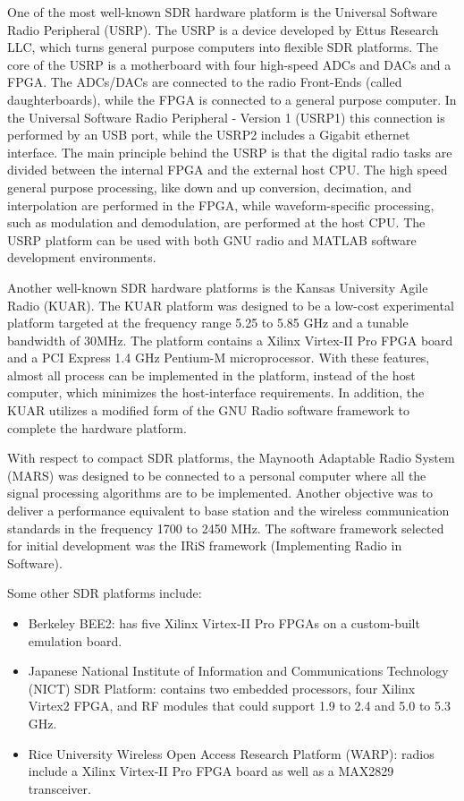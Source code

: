 \documentclass{article}
\begin{document}
One of the most well-known SDR hardware platform is the Universal Software Radio Peripheral (USRP). The USRP is a device developed by Ettus Research LLC, which turns general purpose computers into flexible SDR platforms. The core of the USRP is a motherboard with four high-speed ADCs and DACs and a FPGA. The ADCs/DACs are connected to the radio Front-Ends (called daughterboards), while the FPGA is connected to a general purpose computer. In the Universal Software Radio Peripheral - Version 1 (USRP1) this connection is performed by an USB port, while the USRP2 includes a Gigabit ethernet interface. The main principle behind the USRP is that the digital radio tasks are divided between the internal FPGA and the external host CPU. The high speed general purpose processing, like down and up conversion, decimation, and interpolation are performed in the FPGA, while waveform-specific processing, such as modulation and demodulation, are performed at the host CPU. The USRP platform can be used with both GNU radio and MATLAB software development environments.

Another well-known SDR hardware platforms is the Kansas University Agile Radio (KUAR). The KUAR platform was designed to be a low-cost experimental platform
targeted at the frequency range 5.25 to 5.85 GHz and a tunable bandwidth of 30MHz. The platform contains a Xilinx Virtex-II Pro FPGA board and a PCI Express 1.4 GHz Pentium-M microprocessor. With these features, almost all process can be implemented in the platform, instead of the host computer, which minimizes the host-interface requirements. In addition, the KUAR utilizes a modified form of the GNU Radio software framework to complete the hardware platform.

With respect to compact SDR platforms, the Maynooth Adaptable Radio System (MARS) was designed to be connected to a personal computer where all the signal processing algorithms are to be implemented. Another objective was to deliver a
performance equivalent to base station and the wireless communication standards in the frequency 1700 to 2450 MHz. The software framework selected for initial development was the IRiS framework (Implementing Radio in Software).

Some other SDR platforms include:

\begin{itemize}
\item Berkeley BEE2: has five Xilinx Virtex-II Pro FPGAs on a custom-built emulation board.
\item Japanese National Institute of Information and Communications Technology (NICT) SDR Platform: contains two embedded processors, four Xilinx Virtex2 FPGA, and RF modules that could support 1.9 to 2.4 and 5.0 to 5.3 GHz.
\item Rice University Wireless Open Access Research Platform (WARP): radios include a Xilinx Virtex-II Pro FPGA board as well as a MAX2829 transceiver.
\end{itemize}
\end{document}
